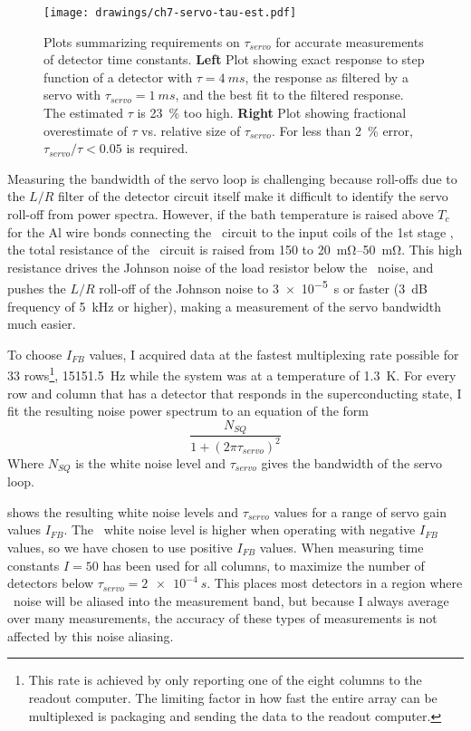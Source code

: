 \begin{figure*}
\texttt{[image: drawings/ch7-servo-tau-est.pdf]}
\caption{Plots summarizing requirements on $\tau_{servo}$ for accurate measurements of detector time constants.
\textbf{Left} Plot showing exact response to step function of a detector with $\tau = \SI{4}{ms}$, the response as filtered by a servo with $\tau_{servo} = \SI{1}{ms}$, and the best fit to the filtered response. The estimated $\tau$ is \SI{23}{\percent} too high.
\textbf{Right} Plot showing fractional overestimate of $\tau$ vs. relative size of $\tau_{servo}$.
For less than \SI{2}{\percent} error, $\tau_{servo}/\tau < \num{0.05}$ is required.
}
\label{fig:ch7-servo-tau-est}
\end{figure*}

Measuring the bandwidth of the servo loop is challenging because roll-offs due to the $L/R$ filter of the detector circuit itself make it difficult to identify the servo roll-off from power spectra.
However, if the bath temperature is raised above $T_c$ for the Al wire bonds connecting the \TES\ circuit to the input coils of the 1st stage \SQUIDs, the total resistance of the \TES\ circuit is raised from \SI{150}{\uohm} to \SIrange{20}{50}{\mohm}.
This high resistance drives the Johnson noise of the load resistor below the \SQUID\ noise, and pushes the $L/R$ roll-off of the Johnson noise to \SI{3e-5}{s} or faster (\SI{3}{\dB} frequency of \SI{5}{\kilo\Hz} or higher), making a measurement of the servo bandwidth much easier.

To choose $I_{FB}$ values, I acquired data at the fastest multiplexing rate possible for 33 rows\footnote{This rate is achieved by only reporting one of the eight columns to the readout computer. The limiting factor in how fast the entire array can be multiplexed is packaging and sending the data to the readout computer.}, \SI{15151.5}{Hz} while the system was at a temperature of \SI{1.3}{\K}.
For every row and column that has a detector that responds in the superconducting state, I fit the resulting noise power spectrum to an equation of the form
\begin{equation}
  \frac{N_{SQ}}{1 + (2 \pi \tau_{servo})^2}
\end{equation}
Where $N_{SQ}$ is the white noise level and $\tau_{servo}$ gives the bandwidth of the servo loop.

 shows the resulting white noise levels and $\tau_{servo}$ values for a range of servo gain values $I_{FB}$.
The \SQUID\ white noise level is higher when operating with negative $I_{FB}$ values, so we have chosen to use positive $I_{FB}$ values.
When measuring time constants $I=50$ has been used for all columns, to maximize the number of detectors below $\tau_{servo} = \SI{2e-4}{s}$.
This places most detectors in a region where \SQUID\ noise will be aliased into the measurement band, but because I always average over many measurements, the accuracy of these types of measurements is not affected by this noise aliasing.

